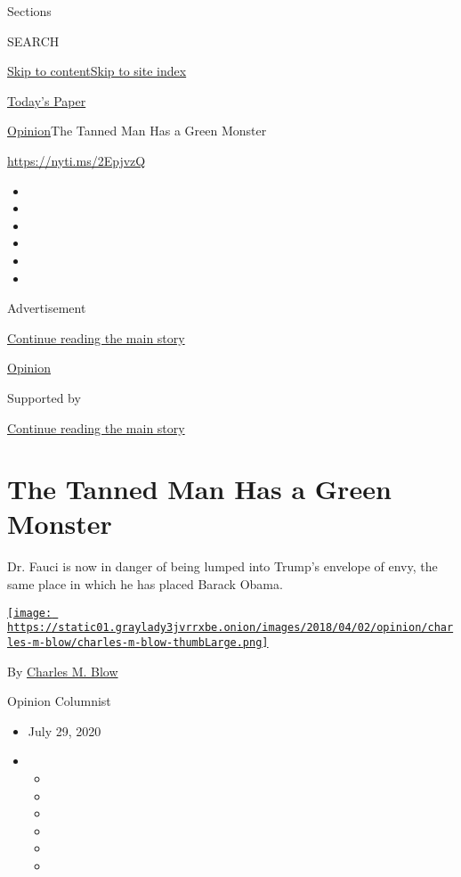 Sections

SEARCH

\protect\hyperlink{site-content}{Skip to
content}\protect\hyperlink{site-index}{Skip to site index}

\href{https://myaccount.nytimes3xbfgragh.onion/auth/login?response_type=cookie\&client_id=vi}{}

\href{https://www.nytimes3xbfgragh.onion/section/todayspaper}{Today's
Paper}

\href{/section/opinion}{Opinion}\textbar{}The Tanned Man Has a Green
Monster

\url{https://nyti.ms/2EpjvzQ}

\begin{itemize}
\item
\item
\item
\item
\item
\item
\end{itemize}

Advertisement

\protect\hyperlink{after-top}{Continue reading the main story}

\href{/section/opinion}{Opinion}

Supported by

\protect\hyperlink{after-sponsor}{Continue reading the main story}

\hypertarget{the-tanned-man-has-a-green-monster}{%
\section{The Tanned Man Has a Green
Monster}\label{the-tanned-man-has-a-green-monster}}

Dr. Fauci is now in danger of being lumped into Trump's envelope of
envy, the same place in which he has placed Barack Obama.

\href{https://www.nytimes3xbfgragh.onion/by/charles-m-blow}{\texttt{[image: https://static01.graylady3jvrrxbe.onion/images/2018/04/02/opinion/charles-m-blow/charles-m-blow-thumbLarge.png]}}

By \href{https://www.nytimes3xbfgragh.onion/by/charles-m-blow}{Charles
M. Blow}

Opinion Columnist

\begin{itemize}
\item
  July 29, 2020
\item
  \begin{itemize}
  \item
  \item
  \item
  \item
  \item
  \item
  \end{itemize}
\end{itemize}

